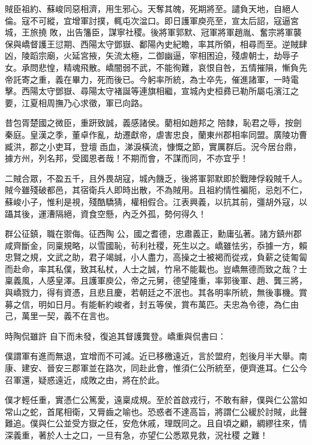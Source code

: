 \begin{pinyinscope}
 賊臣祖約、蘇峻同惡相濟，用生邪心。天奪其魄，死期將至。譴負天地，自絕人倫。寇不可縱，宜增軍討撲，輒屯次湓口。即日護軍庾亮至，宣太后詔，寇逼宮城，王旅撓
 敗，出告籓臣，謀寧社稷。後將軍郭默、冠軍將軍趙胤、奮宗將軍襲保與嶠督護王愆期、西陽太守鄧嶽、鄱陽內史紀瞻，率其所領，相尋而至。逆賊肆凶，陵蹈宗廟，火延宮掖，矢流太極，二御幽逼，宰相困迫，殘虐朝士，劫辱子女。承問悲惶，精魂飛散。嶠闇弱不武，不能徇難，哀恨自咎，五情摧隕，慚負先帝託寄之重，義在畢力，死而後已。今躬率所統，為士卒先，催進諸軍，一時電擊。西陽太守鄧嶽、尋陽太守褚誕等連旗相繼，宣城內史桓彞已勒所屬屯濱江之要，江夏相周撫乃心求徵，軍已向路。



 昔包胥楚國之微臣，重趼致誠，義感諸侯。藺相如趙邦之
 陪隸，恥君之辱，按劍秦庭。皇漢之季，董卓作亂，劫遷獻帝，虐害忠良，蘭東州郡相率同盟。廣陵功曹臧洪，郡之小吏耳，登壇臿血，涕淚橫流，慷慨之節，實厲群后。況今居台鼎，據方州，列名邦，受國恩者哉！不期而會，不謀而同，不亦宜乎！



 二賊合眾，不盈五千，且外畏胡寇，城內饑乏，後將軍郭默即於戰陣俘殺賊千人。賊今雖殘破都邑，其宿衛兵人即時出散，不為賊用。且祖約情性褊阨，忌剋不仁，蘇峻小子，惟利是視，殘酷驕猜，權相假合。江表興義，以抗其前，彊胡外寇，以躡其後，運漕隔絕，資食空懸，內乏外孤，勢何得久！



 群公征鎮，職在禦侮。征西陶
 公，國之耆德，忠肅義正，勳庸弘著。諸方鎮州郡咸齊斷金，同稟規略，以雪國恥，茍利社稷，死生以之。嶠雖怯劣，忝據一方，賴忠賢之規，文武之助，君子竭誠，小人盡力，高操之士被褐而從戎，負薪之徒匍匐而赴命，率其私僕，致其私杖，人士之誠，竹帛不能載也。豈嶠無德而致之哉？士稟義風，人感皇澤。且護軍庾公，帝之元舅，德望隆重，率郭後軍、趙、龔三將，與嶠戮力，得有資憑，且悲且慶，若朝廷之不泯也。其各明率所統，無後事機。賞募之信，明如日月。有能斬約峻者，封五等侯，賞布萬匹。夫忠為令德，為仁由己，萬里一契，義不在言也。



 時陶侃雖許
 自下而未發，復追其督護龔登。嶠重與侃書曰：



 僕謂軍有進而無退，宜增而不可減。近已移檄遠近，言於盟府，剋後月半大舉。南康、建安、晉安三郡軍並在路次，同赴此會，惟須仁公所統至，便齊進耳。仁公今召軍還，疑惑遠近，成敗之由，將在於此。



 僕才輕任重，實憑仁公篤愛，遠稟成規。至於首啟戎行，不敢有辭，僕與仁公當如常山之蛇，首尾相衛，又脣齒之喻也。恐惑者不達高旨，將謂仁公緩於討賊，此聲難追。僕與仁公並受方嶽之任，安危休戚，理既同之。且自頃之顧，綢繆往來，情深義重，著於人士之口，一旦有急，亦望仁公悉眾見救，況社稷
 之難！




\end{pinyinscope}

